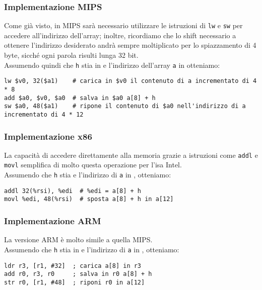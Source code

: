 \documentclass[class=book, crop=false, oneside]{standalone}
\begin{document}
\subsubsection{Implementazione MIPS}
Come già visto, in MIPS sarà necessario utilizzare le istruzioni di \texttt{lw} e \texttt{sw} per accedere all'indirizzo dell'array; inoltre, ricordiamo che  lo shift necessario a ottenere l'indirizzo desiderato andrà sempre moltiplicato per lo spiazzamento di 4 byte, sicché ogni parola risulti lunga 32 bit.\\
Assumendo quindi che \texttt{h} stia in  e l'indirizzo dell'array \texttt{a} in  otteniamo:
\begin{verbatim}
lw $v0, 32($a1)    # carica in $v0 il contenuto di a incrementato di 4 * 8
add $a0, $v0, $a0  # salva in $a0 a[8] + h
sw $a0, 48($a1)    # ripone il contenuto di $a0 nell'indirizzo di a incrementato di 4 * 12
\end{verbatim}

\subsubsection{Implementazione x86}
La capacità di accedere direttamente alla memoria grazie a istruzioni come \texttt{addl} e \texttt{movl} semplifica di molto questa operazione per l'\acrshort{isa} Intel.\\
Assumendo che  \texttt{h} stia  e l'indirizzo di \texttt{a} in , otteniamo:
\begin{verbatim}
addl 32(%rsi), %edi  # %edi = a[8] + h
movl %edi, 48(%rsi)  # sposta a[8] + h in a[12]
\end{verbatim}

\subsubsection{Implementazione ARM}
La versione ARM è molto simile a quella MIPS.\\
Assumendo che \texttt{h} stia in  e l'indirizzo di \texttt{a} in , otteniamo:
\begin{verbatim}
ldr r3, [r1, #32]  ; carica a[8] in r3
add r0, r3, r0     ; salva in r0 a[8] + h
str r0, [r1, #48]  ; riponi r0 in a[12]
\end{verbatim}
\end{document}
